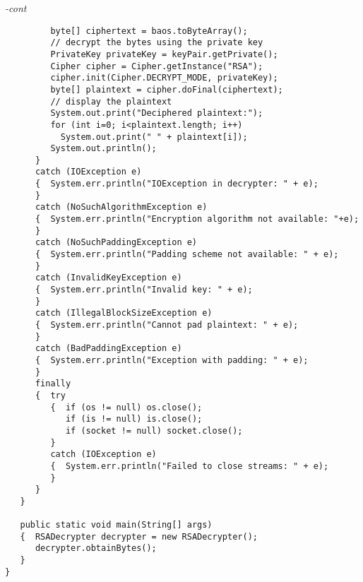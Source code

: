 \begin{figure*}\begin{program}\emph{-cont}\begin{verbatim}
         byte[] ciphertext = baos.toByteArray();
         // decrypt the bytes using the private key
         PrivateKey privateKey = keyPair.getPrivate();
         Cipher cipher = Cipher.getInstance("RSA");
         cipher.init(Cipher.DECRYPT_MODE, privateKey);
         byte[] plaintext = cipher.doFinal(ciphertext);
         // display the plaintext
         System.out.print("Deciphered plaintext:");
         for (int i=0; i<plaintext.length; i++)
           System.out.print(" " + plaintext[i]);
         System.out.println();
      }
      catch (IOException e)
      {  System.err.println("IOException in decrypter: " + e);
      }
      catch (NoSuchAlgorithmException e)
      {  System.err.println("Encryption algorithm not available: "+e);
      }
      catch (NoSuchPaddingException e)
      {  System.err.println("Padding scheme not available: " + e);
      }
      catch (InvalidKeyException e)
      {  System.err.println("Invalid key: " + e);
      }
      catch (IllegalBlockSizeException e)
      {  System.err.println("Cannot pad plaintext: " + e);
      }
      catch (BadPaddingException e)
      {  System.err.println("Exception with padding: " + e);
      }
      finally
      {  try
         {  if (os != null) os.close();
            if (is != null) is.close();
            if (socket != null) socket.close();
         }
         catch (IOException e)
         {  System.err.println("Failed to close streams: " + e);
         }
      }
   }

   public static void main(String[] args)
   {  RSADecrypter decrypter = new RSADecrypter();
      decrypter.obtainBytes();
   }
}
\end{verbatim}\end{program}\end{figure*}
